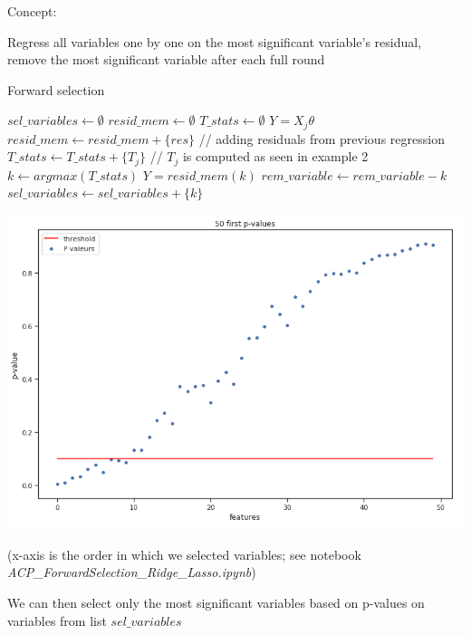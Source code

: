 \vspace{5mm}

Concept: 

Regress all variables one by one on the most significant variable's residual, remove the most significant variable after each full round

\vspace{20mm}

\begin{algorithm}
\caption{Forward selection}
\begin{algorithmic}
\State $sel \_ variables \leftarrow \emptyset$
\State $resid \_mem \leftarrow \emptyset$
\State $T \_stats \leftarrow \emptyset$
\State $Y = X_j\theta$
\State $resid \_mem \leftarrow resid \_mem + \{res\}$ // adding residuals from previous regression
\State $T \_ stats \leftarrow T \_stats + \{T_j\}$ // $T_j$ is computed as seen in example 2
\EndFor
\State $k \leftarrow argmax(T \_ stats)$
\State $Y = resid \_ mem (k)$
\State $rem \_ variable \leftarrow rem \_ variable - {k}$
\State $sel \_ variables \leftarrow sel \_ variables + \{k\}$
\EndFor
\end{algorithmic}
\end{algorithm}

\begin{center}
\includegraphics[scale=0.5]{forward_sel_pval.png}
\end{center}

(x-axis is the order in which we selected variables; see notebook \textit{ACP\_ForwardSelection\_Ridge\_Lasso.ipynb})

We can then select only the most significant variables based on p-values on variables from list $sel \_ variables$

